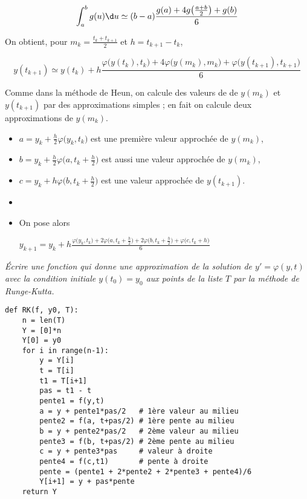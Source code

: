 \[ \int_{a}^b g(u) \d u\simeq (b-a)\frac{g(a)+4g\bigl(\frac{a+b}2\bigr)+g(b)}6\]

On obtient, pour $m_k = \frac{t_k+t_{k+1}}2$ et $h=t_{k+1}-t_k$,

\[ y(t_{k+1})\simeq y(t_k) + h \frac {\varphi\bigl(y(t_k),t_k\bigr)+4\varphi\bigl(y(m_k),m_k\bigr) + \varphi\bigl(y(t_{k+1}),t_{k+1}\bigr)}6 \]


Comme dans la méthode de Heun, on calcule des valeurs de de $y(m_k)$ et $y(t_{k+1})$ par des approximations simples ; en fait on calcule deux approximations de $y(m_k)$.


\begin{itemize}
\item $a = y_k+\frac{h}2 \varphi\bigl(y_k,t_k\bigr)$ est une première valeur approchée de $y(m_k)$,

\item $ b = y_k + \frac{h}2 \varphi\bigl(a, t_k+\frac h2\bigr)$ est aussi une valeur approchée de $y(m_k)$,

\item $c = y_k + h \varphi\bigl(b, t_k+\frac h2\bigr)$ est une valeur approchée de $y(t_{k+1})$.
\item 
\item On pose alors 

$\displaystyle  y_{k+1} = y_k+ h \frac{\varphi\bigl(y_k,t_k\bigr) + 2\varphi\bigl(a, t_k+\frac h2\bigr) + 2\varphi\bigl(b, t_k+\frac h2\bigr)  + \varphi\bigl(c, t_k+h\bigr)}6$
\end{itemize}
\begin{Exercise}[label={exo:RK}]\it
Écrire une fonction  qui donne une approximation de la solution de $y' = \varphi(y, t)$ avec la condition initiale $y(t_0)=y_0$ aux points de la liste $T$ par la méthode de Runge-Kutta.
\end{Exercise}
\begin{Answer}
\begin{lstlisting}
def RK(f, y0, T):
    n = len(T)
    Y = [0]*n
    Y[0] = y0 
    for i in range(n-1): 
        y = Y[i]
        t = T[i]
        t1 = T[i+1]
        pas = t1 - t
        pente1 = f(y,t)
        a = y + pente1*pas/2   # 1ère valeur au milieu
        pente2 = f(a, t+pas/2) # 1ère pente au milieu
        b = y + pente2*pas/2   # 2ème valeur au milieu
        pente3 = f(b, t+pas/2) # 2ème pente au milieu
        c = y + pente3*pas     # valeur à droite
        pente4 = f(c,t1)       # pente à droite
        pente = (pente1 + 2*pente2 + 2*pente3 + pente4)/6
        Y[i+1] = y + pas*pente
    return Y
\end{lstlisting}
\end{Answer}

